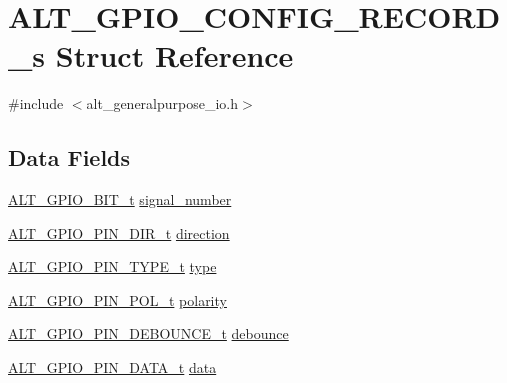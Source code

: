 \hypertarget{structALT__GPIO__CONFIG__RECORD__s}{}\section{A\+L\+T\+\_\+\+G\+P\+I\+O\+\_\+\+C\+O\+N\+F\+I\+G\+\_\+\+R\+E\+C\+O\+R\+D\+\_\+s Struct Reference}
\label{structALT__GPIO__CONFIG__RECORD__s}


{\ttfamily \#include $<$alt\+\_\+generalpurpose\+\_\+io.\+h$>$}

\subsection*{Data Fields}
\begin{DoxyCompactItemize}
\item 
\mbox{\hyperlink{group__ALT__GPIO__BITVIEW_ga6d149a5961bef8b91b8108e3838b1e09}{A\+L\+T\+\_\+\+G\+P\+I\+O\+\_\+B\+I\+T\+\_\+t}} \mbox{\hyperlink{structALT__GPIO__CONFIG__RECORD__s_a6ca553642a90fdcc8ce978feda1bd747}{signal\+\_\+number}}
\item 
\mbox{\hyperlink{group__ALT__GPIO__API__CONFIG_ga96132f0cfe4bb0ffc0f9ec8a392a45f3}{A\+L\+T\+\_\+\+G\+P\+I\+O\+\_\+\+P\+I\+N\+\_\+\+D\+I\+R\+\_\+t}} \mbox{\hyperlink{structALT__GPIO__CONFIG__RECORD__s_a65a176e2de024aa2aec5b618282997f8}{direction}}
\item 
\mbox{\hyperlink{group__ALT__GPIO__API__CONFIG_gafa3659cf3d59e915a16c591a73258eef}{A\+L\+T\+\_\+\+G\+P\+I\+O\+\_\+\+P\+I\+N\+\_\+\+T\+Y\+P\+E\+\_\+t}} \mbox{\hyperlink{structALT__GPIO__CONFIG__RECORD__s_a132d01ef65fc88334a623858ea73445f}{type}}
\item 
\mbox{\hyperlink{group__ALT__GPIO__API__CONFIG_gac97da06ff658611bcd2b12753dfc4a10}{A\+L\+T\+\_\+\+G\+P\+I\+O\+\_\+\+P\+I\+N\+\_\+\+P\+O\+L\+\_\+t}} \mbox{\hyperlink{structALT__GPIO__CONFIG__RECORD__s_a00b93306325650bcd69af38e1b1ce9bf}{polarity}}
\item 
\mbox{\hyperlink{group__ALT__GPIO__API__CONFIG_gac48653c26697d3fd17d9029252655ac2}{A\+L\+T\+\_\+\+G\+P\+I\+O\+\_\+\+P\+I\+N\+\_\+\+D\+E\+B\+O\+U\+N\+C\+E\+\_\+t}} \mbox{\hyperlink{structALT__GPIO__CONFIG__RECORD__s_a9c3d5641af7871520e43c6b721734661}{debounce}}
\item 
\mbox{\hyperlink{group__ALT__GPIO__API__CONFIG_ga757cd8797c8bb2ed86d75d961ce9041b}{A\+L\+T\+\_\+\+G\+P\+I\+O\+\_\+\+P\+I\+N\+\_\+\+D\+A\+T\+A\+\_\+t}} \mbox{\hyperlink{structALT__GPIO__CONFIG__RECORD__s_aa4d457f43ced1bb62fea14cdc92793c1}{data}}
\end{DoxyCompactItemize}


